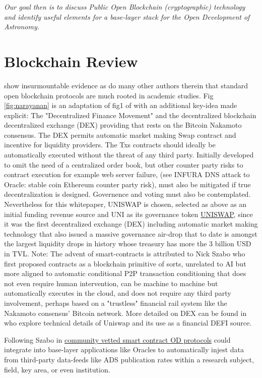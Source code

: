 \documentclass[final,5p,times,twocolumn,authoryear]{elsarticle}
\begin{document}
\emph{Our goal then is to discuss Public Open Blockchain (cryptographic) technology and identify useful elements for a base-layer stack for the Open Development of Astronomy.}

\section{Blockchain Review}
\label{sec:bc_review}
\cite{arvindandclark2017} show insurmountable evidence as do many other authors therein that standard open blockchain protocols are much rooted in academic studies. Fig \ref{fig:narayanan} is an adaptation of fig1 of \citet{arvindandclark2017} with an additional key-idea made explicit: The "Decentralized Finance Movement" and the decentralized blockchain decentralized exchange (DEX) providing that rests on the Bitcoin Nakamoto consensus. The DEX permits automatic market making Swap contract and incentive for liquidity providers. The Txs contracts should ideally be automatically executed without the threat of any third party. Initially developed to omit the need of a centralized order book,  but other counter party risks to contract execution for example web server failure, (see INFURA DNS attack to Oracle: stable coin Ethereum counter party risk), must also be mitigated if true decentralization is designed. Governence and voting must also be contemplated. Nevertheless for this whitepaper, UNISWAP is chosen, selected as above as an initial funding revenue source and UNI as its governance token \href{https://github.com/Uniswap}{UNISWAP}, since it was the first decentralized exchange (DEX) including automatic market making technology that also issued a massive governance air-drop that to date is amongst the largest liquidity drops in history whose treasury has more the 3 billion USD in TVL. Note: The advent of smart-contracts is attributed to Nick Szabo who first proposed contracts as a blockchain primitive of sorts, unrelated to AI but more aligned to automatic conditional P2P transaction conditioning that does not even require human intervention, can be machine to machine but automatically executes in the cloud, and does not require any third party involvement, perhaps based on a "trustless" financial rail system like the Nakamoto consensus' Bitcoin network. More detailed on DEX can be found in \cite{uniswap2019_angeris} who explore technical details of Uniswap and its use as a financial DEFI source.

Following Szabo in \href{https://www.fon.hum.uva.nl/rob/Courses/InformationInSpeech/CDROM/Literature/LOTwinterschool2006/szabo.best.vwh.net/smart_contracts_2.html}{community vetted smart contract OD protocols} could integrate into base-layer applications like Oracles to automatically injest data from third-party data-feeds like ADS publication rates within a research subject, field, key area,  or even institution.
\end{document}
